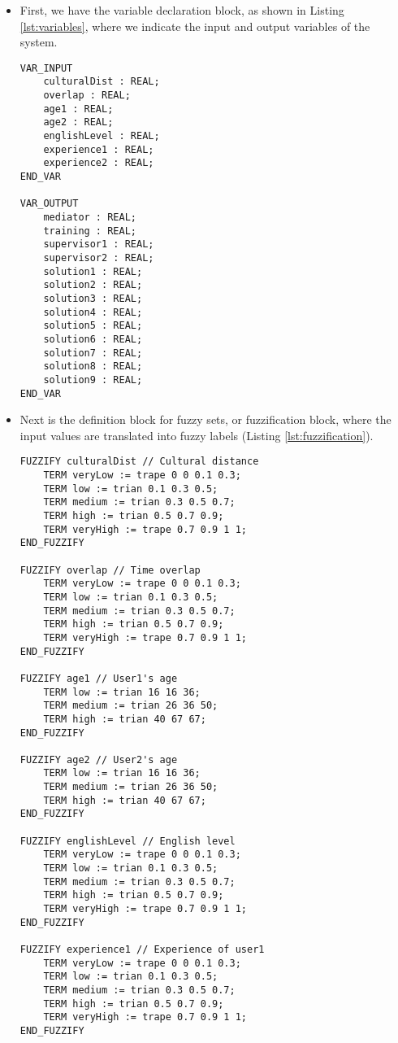 \begin{itemize}
\item First, we have the variable declaration block, as shown in Listing \ref{lst:variables}, where we indicate the input and output variables of the system.

\begin{lstlisting}[caption={[Variables declaration]Variables declaration}, label=lst:variables]
VAR_INPUT
	culturalDist : REAL;
	overlap : REAL;
	age1 : REAL;
	age2 : REAL;
	englishLevel : REAL;
	experience1 : REAL;
	experience2 : REAL;
END_VAR

VAR_OUTPUT
	mediator : REAL;
	training : REAL;
	supervisor1 : REAL;
	supervisor2 : REAL;
	solution1 : REAL;
	solution2 : REAL;
	solution3 : REAL;
	solution4 : REAL;
	solution5 : REAL;
	solution6 : REAL;
	solution7 : REAL;
	solution8 : REAL;
	solution9 : REAL;
END_VAR
\end{lstlisting}

\item Next is the definition block for fuzzy sets, or fuzzification block, where the input values are translated into fuzzy labels (Listing \ref{lst:fuzzification}).

\begin{lstlisting}[caption={[Fuzzification block]Fuzzification block}, label=lst:fuzzification]
FUZZIFY culturalDist // Cultural distance
	TERM veryLow := trape 0 0 0.1 0.3;
	TERM low := trian 0.1 0.3 0.5;
	TERM medium := trian 0.3 0.5 0.7;
	TERM high := trian 0.5 0.7 0.9;
	TERM veryHigh := trape 0.7 0.9 1 1;
END_FUZZIFY

FUZZIFY overlap // Time overlap
	TERM veryLow := trape 0 0 0.1 0.3;
	TERM low := trian 0.1 0.3 0.5;
	TERM medium := trian 0.3 0.5 0.7;
	TERM high := trian 0.5 0.7 0.9;
	TERM veryHigh := trape 0.7 0.9 1 1;
END_FUZZIFY

FUZZIFY age1 // User1's age
	TERM low := trian 16 16 36;
	TERM medium := trian 26 36 50;
	TERM high := trian 40 67 67;
END_FUZZIFY

FUZZIFY age2 // User2's age
	TERM low := trian 16 16 36;
	TERM medium := trian 26 36 50;
	TERM high := trian 40 67 67;
END_FUZZIFY

FUZZIFY englishLevel // English level
	TERM veryLow := trape 0 0 0.1 0.3;
	TERM low := trian 0.1 0.3 0.5;
	TERM medium := trian 0.3 0.5 0.7;
	TERM high := trian 0.5 0.7 0.9;
	TERM veryHigh := trape 0.7 0.9 1 1;
END_FUZZIFY

FUZZIFY experience1 // Experience of user1
	TERM veryLow := trape 0 0 0.1 0.3;
	TERM low := trian 0.1 0.3 0.5;
	TERM medium := trian 0.3 0.5 0.7;
	TERM high := trian 0.5 0.7 0.9;
	TERM veryHigh := trape 0.7 0.9 1 1;
END_FUZZIFY


\end{lstlisting}
\end{itemize}
